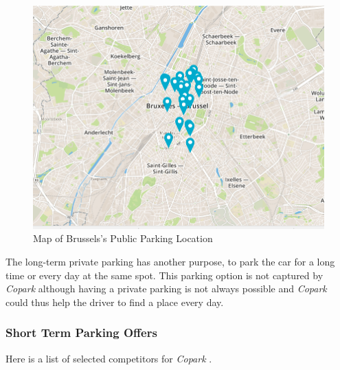 \documentclass[12pt,a4paper,oneside]{book}
\newcommand{\bp}{\textit{Copark }}
\begin{document}
\begin{figure}[h]
\centering
\caption{Map of Brussels's Public Parking Location\cite{pubparkmap}}
\label{pubparcmap}
\includegraphics[keepaspectratio=true,width=\textwidth-2cm]{../images/publicpark.png}
\end{figure}

The long-term private parking has another purpose, to park the car for a long time or every day at the same spot. This parking option is not captured by \bp although having a private parking is not always possible and \bp could thus help the driver to find a place every day.

\subsubsection{Short Term Parking Offers}

Here is a list of selected competitors for \bp .
\end{document}
